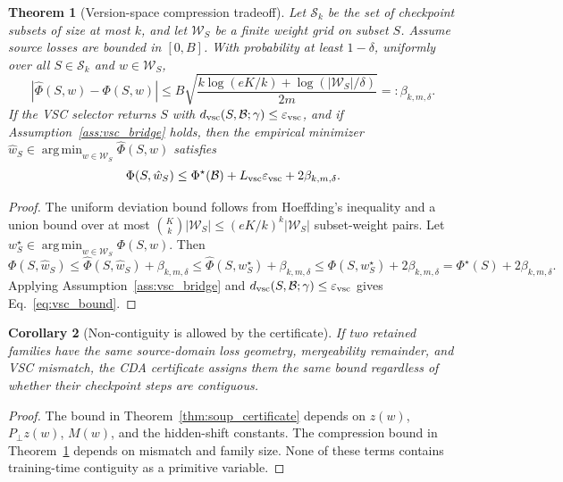 \documentclass{article}
\newtheorem{theorem}{Theorem}[section]
\newtheorem{corollary}[theorem]{Corollary}
\theoremstyle{definition}
\newcommand{\cB}{\mathcal{B}}
\newcommand{\cS}{\mathcal{S}}
\newcommand{\cW}{\mathcal{W}}
\newcommand{\argmin}{\operatorname*{arg\,min}}
\newcommand{\eps}{\varepsilon}
\newcommand{\abs}[1]{\left\lvert #1 \right\rvert}
\begin{document}
\begin{theorem}[Version-space compression tradeoff]
\label{thm:vsc_bound}
Let \(\cS_k\) be the set of checkpoint subsets of size at most \(k\), and let \(\cW_S\) be a finite weight grid on subset \(S\). Assume source losses are bounded in \([0,B]\). With probability at least \(1-\delta\), uniformly over all \(S\in\cS_k\) and \(w\in\cW_S\),
\[
\abs{\widehat\Phi(S,w)-\Phi(S,w)}
\le
B\sqrt{
\frac{k\log(eK/k)+\log(|\cW_S|/\delta)}{2m}
}
=:\beta_{k,m,\delta}.
\]
If the VSC selector returns \(S\) with \(d_{\rm vsc}(S,\cB;\gamma)\le \eps_{\rm vsc}\), and if Assumption~\ref{ass:vsc_bridge} holds, then the empirical minimizer \(\hat w_S\in\argmin_{w\in\cW_S}\widehat\Phi(S,w)\) satisfies
\begin{equation}
\Phi(S,\hat w_S)
\le
\Phi^\star(\cB)
+L_{\rm vsc}\eps_{\rm vsc}
+2\beta_{k,m,\delta}.
\label{eq:vsc_bound}
\end{equation}
\end{theorem}

\begin{proof}
The uniform deviation bound follows from Hoeffding's inequality and a union bound over at most \(\binom{K}{k}|\cW_S|\le (eK/k)^k|\cW_S|\) subset-weight pairs. Let \(w_S^\star\in\argmin_{w\in\cW_S}\Phi(S,w)\). Then
\[
\Phi(S,\hat w_S)
\le
\widehat\Phi(S,\hat w_S)+\beta_{k,m,\delta}
\le
\widehat\Phi(S,w_S^\star)+\beta_{k,m,\delta}
\le
\Phi(S,w_S^\star)+2\beta_{k,m,\delta}
=
\Phi^\star(S)+2\beta_{k,m,\delta}.
\]
Applying Assumption~\ref{ass:vsc_bridge} and \(d_{\rm vsc}(S,\cB;\gamma)\le\eps_{\rm vsc}\) gives Eq.~\eqref{eq:vsc_bound}.
\end{proof}

\begin{corollary}[Non-contiguity is allowed by the certificate]
\label{cor:noncontiguous}
If two retained families have the same source-domain loss geometry, mergeability remainder, and VSC mismatch, the CDA certificate assigns them the same bound regardless of whether their checkpoint steps are contiguous.
\end{corollary}

\begin{proof}
The bound in Theorem~\ref{thm:soup_certificate} depends on \(z(w)\), \(P_\perp z(w)\), \(M(w)\), and the hidden-shift constants. The compression bound in Theorem~\ref{thm:vsc_bound} depends on mismatch and family size. None of these terms contains training-time contiguity as a primitive variable.
\end{proof}
\end{document}
